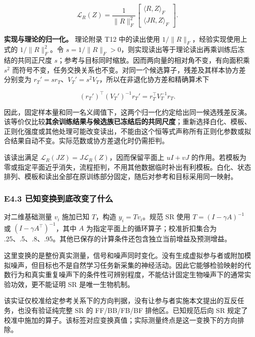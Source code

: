 \documentclass[11pt,a4paper]{article}
\begin{document}
\[
\mathcal L_R(Z)=\frac{1}{\|R\|_F^2}
\begin{bmatrix}\langle R,Z\rangle_F\\\langle JR,Z\rangle_F\end{bmatrix}.
\]

\textbf{实现与理论的归一化。} 理论附录 T12 中的读出使用
\(1/\|R\|_F\)，经验实现使用上式的 \(1/\|R\|_F^2\)。令
\(s=1/\|R\|_F>0\)，则实现读出等于理论读出再乘训练后冻结的共同正尺度
\(s\)；参考与目标同时缩放。因而两向量的相对角不变，有向面积乘 \(s^2\)
而符号不变，任务交换关系也不变。对同一个候选算子，残差及其样本协方差分别变为
\(r_T'=s r_T\)、\(V_T'=s^2V_T\)，所以在非退化协方差和精确算术下

\[
(r_T')^\top(V_T')^{-1}r_T'=r_T^\top V_T^{-1}r_T.
\]

因此，固定样本量和同一名义阈值下，这两个归一化约定给出同一候选残差反演。该等价仅比较\textbf{其余训练结果与候选族已冻结后的共同尺度}；重新选择白化、模板、正则化强度或其他处理可能改变读出，不能由这个恒等式声称所有正则化参数或拟合结果自动不变。实际范数或协方差退化时仍需拒判。

该读出满足 \(\mathcal L_R(JZ)=J\mathcal L_R(Z)\)，因而保留平面上
\(uI+vJ\)
的作用。若模板为零或指定平面近乎消失，流程拒判，不用其他数据临时补出有利模板。白化、状态排列、模板和读出全部在原训练部分固定，随后对参考和目标采用同一映射。

\subsubsection{E4.3
已知变换到底改变了什么}\label{e4.3-ux5df2ux77e5ux53d8ux6362ux5230ux5e95ux6539ux53d8ux4e86ux4ec0ux4e48}

对二维基础测量 \(v_i\) 施加已知 \(T\)，构造 \(y_i=Tv_i\)。规范 SR 使用
\(T=(I-\gamma A)^{-1}\) 或 \((I-\gamma A^\top)^{-1}\)，其中 \(A\)
为指定平面上的循环算子；校准折扣集合为
.25、.5、.8、.95。其他已保存的计算条件还包含独立当前增益及预测增益。

这里变换的是整份真实测量，信号和噪声同时变化。没有生成虚拟参与者或附加模拟噪声，但目标也不是自然学习任务新采集的神经活动。因此它能够检验映射的代数行为和真实重复噪声下的条件性可辨别程度，不能估计固定生物噪声下的通常实验功效，更不能证明
SR 是唯一生物机制。

该实证仅校准给定参考关系下的方向判据，没有让参与者实施本文提出的互反任务，也没有验证纯完整
SR 的 FF/BB/FB/BF 排他区。已知规范后向 SR
规定了校准中施加的算子。该标签对应变换真值；实际测量终点是这一变换下的方向排除。

\end{document}

